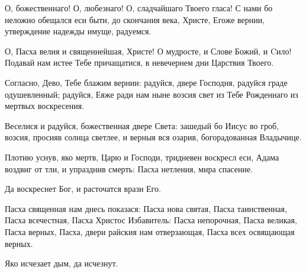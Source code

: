 \begin{mymulticols}




О, божественнаго! О, любезнаго! О, сладчайшаго Твоего гласа! С нами бо неложно обещался еси быти, до скончания века, Христе, Егоже вернии, утверждение надежды имуще, радуемся. 


О, Пасха велия и священнейшая, Христе! О мудросте, и Слове Божий, и Cило! Подавай нам истее Тебе причащатися, в невечернем дни Царствия Твоего. 



Согласно, Дево, Тебе блажим вернии: радуйся, двере Господня, радуйся граде одушевленный; радуйся, Еяже ради нам ныне возсия свет из Тебе Рожденнаго из мертвых воскресения. 


Веселися и радуйся, божественная двере Света: зашедый бо Иисус во гроб, возсия, просияв солнца светлее, и верныя вся озарив, богорадованная Владычице. 


Плотию уснув, яко мертв, Царю и Господи, тридневен воскресл еси, Адама воздвиг от тли, и упразднив смерть: Пасха нетления, мира спасение.  


 Да воскреснет Бог, и расточатся врази Его. 

Пасха священная нам днесь показася: Пасха нова святая, Пасха таинственная, Пасха всечестная, Пасха Христос Избавитель: Пасха непорочная, Пасха великая, Пасха верных, Пасха, двери райския нам отверзающая, Пасха всех освящающая верных. 

 Яко исчезает дым, да исчезнут. 


\end{mymulticols}
